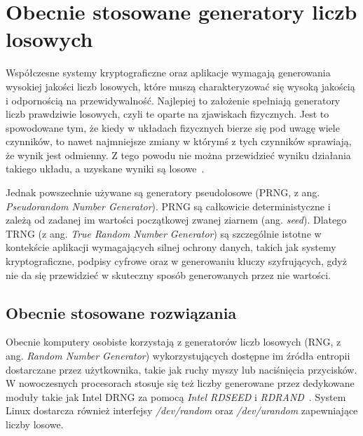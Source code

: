 \chapter{Obecnie stosowane generatory liczb losowych}\label{ch:przeglad-rynku}

Współczesne systemy kryptograficzne oraz aplikacje wymagają generowania wysokiej jakości liczb losowych,
które muszą charakteryzować się wysoką jakością i odpornością na przewidywalność.
Najlepiej to założenie spełniają generatory liczb prawdziwie losowych, czyli te oparte na zjawiskach fizycznych.
Jest to spowodowane tym, że kiedy w układach fizycznych bierze się pod uwagę wiele czynników, to nawet najmniejsze zmiany
w którymś z tych czynników sprawiają, że wynik jest odmienny.
Z tego powodu nie można przewidzieć wyniku działania takiego układu, a uzyskane wyniki są losowe~\cite{chaos}.

Jednak powszechnie używane są generatory pseudolosowe (PRNG, z ang. \textit{Pseudorandom Number Generator}).
PRNG są całkowicie deterministyczne i zależą od zadanej im wartości początkowej zwanej ziarnem (ang. \textit{seed}).
Dlatego TRNG (z ang. \textit{True Random Number Generator}) są szczególnie istotne w kontekście aplikacji wymagających silnej 
ochrony danych, takich jak systemy kryptograficzne, podpisy cyfrowe oraz w generowaniu kluczy szyfrujących,
gdyż nie da się przewidzieć w skuteczny sposób generowanych przez nie wartości.

\section{Obecnie stosowane rozwiązania}\label{sec:obecnie-stosowane-rozwiazania}

Obecnie komputery osobiste korzystają z generatorów liczb losowych (RNG, z ang. \textit{Random Number Generator})
wykorzystujących dostępne im źródła entropii dostarczane przez użytkownika, takie jak ruchy myszy lub naciśnięcia przycisków.
W nowoczesnych procesorach stosuje się też liczby generowane przez dedykowane moduły takie jak Intel DRNG za pomocą \textit{Intel RDSEED} i \textit{RDRAND}~\cite{IntelRD}.
System Linux dostarcza również interfejsy \textit{/dev/random} oraz \textit{/dev/urandom} zapewniające liczby losowe.



